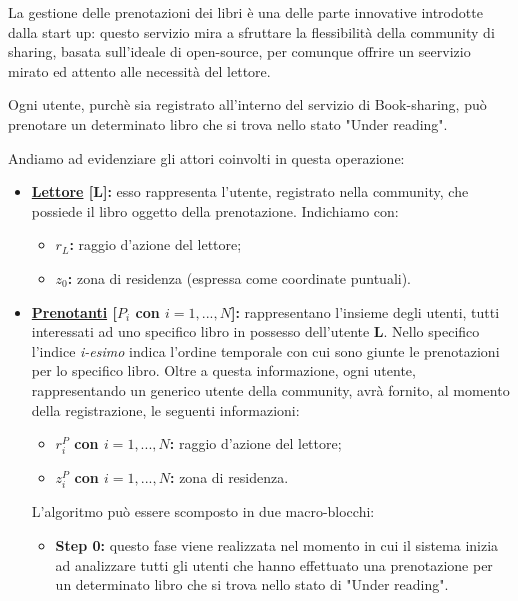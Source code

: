 La gestione delle prenotazioni dei libri è una delle parte innovative introdotte dalla start up: questo servizio mira a sfruttare la flessibilità della community di sharing, basata sull'ideale di open-source, per comunque offrire un seervizio mirato ed attento alle necessità del lettore.

Ogni utente, purchè sia registrato all'interno del servizio di Book-sharing, può prenotare un determinato libro che si trova nello stato "Under reading".

Andiamo ad evidenziare gli attori coinvolti in questa operazione:
\begin{itemize}
	\item \textbf{\underline{Lettore} [L]:} esso rappresenta l'utente, registrato nella community, che possiede il libro oggetto della prenotazione. Indichiamo con:
	\begin{itemize}
		\item \textbf{{\LARGE $r_{L}$}:} raggio d'azione del lettore;
		\item \textbf{{\LARGE $ z_{0} $}:} zona di residenza (espressa come coordinate puntuali).
	\end{itemize}
	\item \textbf{\underline{Prenotanti} [$ P_{i}$ con $i=1,...,N $]:} rappresentano l'insieme degli utenti, tutti interessati ad uno specifico libro in possesso dell'utente \textbf{L}.
	Nello specifico l'indice \textit{i-esimo} indica l'ordine temporale con cui sono giunte le prenotazioni per lo specifico libro.
	Oltre a questa informazione, ogni utente, rappresentando un generico utente della community, avrà fornito, al momento della registrazione, le seguenti informazioni:
	\begin{itemize}
		\item \textbf{{\LARGE $r^{P}_{i}$} con $i=1,...,N $:} raggio d'azione del lettore;
		\item \textbf{{\LARGE $z^{P}_{i}$} con $i=1,...,N $:} zona di residenza.
	\end{itemize}

	L'algoritmo può essere scomposto in due macro-blocchi:
	\begin{itemize}
		\item \textbf{Step 0:} questo fase viene realizzata nel momento in cui il sistema inizia ad analizzare tutti gli utenti che hanno effettuato una prenotazione per un determinato libro che si trova nello stato di "Under reading".
		

\end{itemize}
\end{itemize}
